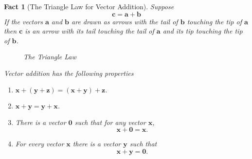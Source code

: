 \documentclass[11pt,reqno,openany]{amsbook}
\numberwithin{figure}{chapter}
\numberwithin{equation}{chapter}
\theoremstyle{plain}
\newtheorem{fact}{Fact}[chapter]
\theoremstyle{definition}
\renewcommand{\vec}[1]{\mathbf{#1}}
\begin{document}
\begin{fact}[The Triangle Law for Vector Addition]
  Suppose
  \[\vec{c}=\vec{a}+\vec{b}\]
  If the vectors $\vec{a}$ and $\vec{b}$ are drawn as arrows with the
  tail of $\vec{b}$ touching the tip of $\vec{a}$ then $\vec{c}$ is an
  arrow with its tail touching the tail of $\vec{a}$ and its tip
  touching the tip of $\vec{b}$.
  
  \begin{figure}[h]
  \caption{The Triangle Law}
  \end{figure}

  Vector addition has the following properties
  \begin{enumerate}
  \item $\vec{x}+(\vec{y}+\vec{z})=(\vec{x}+\vec{y})+\vec{z}$.
  \item $\vec{x}+\vec{y}=\vec{y}+\vec{x}$.
  \item There is a vector $\vec{0}$ such that for any vector
    $\vec{x}$,
    \[\vec{x}+\vec{0}=\vec{x}.\]
  \item For every vector $\vec{x}$ there is a vector $\vec{y}$ such
    that
    \[\vec{x}+\vec{y}=\vec{0}.\]
  \end{enumerate}
\end{fact}
\end{document}

